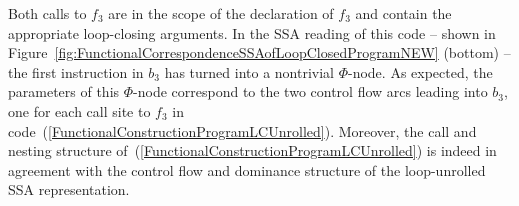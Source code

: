 Both calls to $f_3$ are in the scope of the declaration of $f_3$ and
contain the appropriate loop-closing arguments. In the SSA reading of
this code -- shown in
Figure~\ref{fig:FunctionalCorrespondenceSSAofLoopClosedProgramNEW}
(bottom) -- the first instruction in $b_3$ has turned into a
nontrivial $\Phi$-node. As expected, the parameters of this
$\Phi$-node correspond to the two control flow arcs leading into
$b_3$, one for each call site to $f_3$ in
code~(\ref{FunctionalConstructionProgramLCUnrolled}). Moreover, the
call and nesting structure
of~(\ref{FunctionalConstructionProgramLCUnrolled}) is indeed in
agreement with the control flow and dominance structure of the
loop-unrolled SSA representation.


